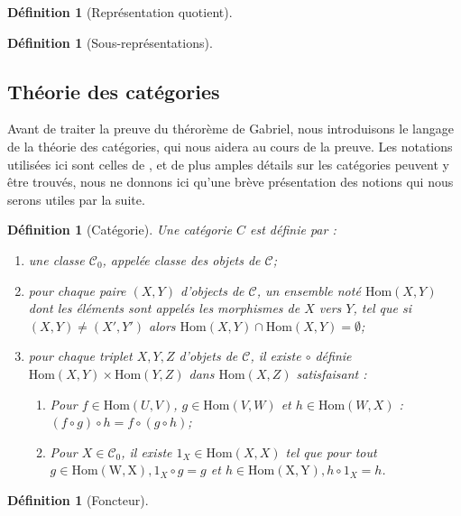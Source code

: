 \documentclass[a4paper,11pt]{article}
\newtheorem{defi}[thm]{Définition}%
\begin{document}
\begin{defi}[Représentation quotient]
\end{defi}
\begin{defi}[Sous-représentations]
\end{defi}
\subsection{Théorie des catégories}
Avant de traiter la preuve du thérorème de Gabriel, nous introduisons le langage de la théorie des catégories, qui nous aidera au cours de la preuve. Les notations utilisées ici sont celles de \cite{A97}, et de plus amples détails sur les catégories peuvent y être trouvés, nous ne donnons ici qu'une brève présentation des notions qui nous serons utiles par la suite.
\begin{defi}[Catégorie]
Une \emph{catégorie} $C$ est définie par :
\begin{enumerate}
\item  une classe $\mathcal C_{0}$, appelée classe des objets de $\mathcal C$;
\item  pour chaque paire $(X,Y)$ d'objects de $\mathcal C$, un ensemble noté $\mathrm{Hom}(X,Y)$ dont les éléments sont appelés les morphismes de $X$ vers $Y$, tel que si $(X,Y) \neq (X',Y')$ alors $\mathrm{Hom}(X,Y) \cap \mathrm{Hom}(X,Y) = \emptyset$;
\item  pour chaque triplet $X,Y,Z$ d'objets de $\mathcal C$, il existe $\circ$ définie $ \mathrm{Hom}(X,Y) \times \mathrm{Hom}(Y,Z)$ dans $ \mathrm{Hom}(X,Z) $ satisfaisant :
  \begin{enumerate}
  \item  Pour $f \in \mathrm{Hom}(U,V)$, $g \in \mathrm{Hom}(V,W)$ et $h \in \mathrm{Hom}(W,X)$ : $(f\circ g) \circ h = f \circ (g \circ h)$;
  \item  Pour $X \in \mathcal C_{0}$, il existe $1_{X} \in \mathrm{Hom}(X,X)$ tel que pour tout $g \in \mathrm{Hom(W,X)}, 1_{X} \circ g = g$ et $h \in \mathrm{Hom(X,Y)}, h \circ 1_{X} = h$.
  \end{enumerate}
\end{enumerate}
\end{defi}
\begin{defi}[Foncteur]
\end{defi}
\end{document}
